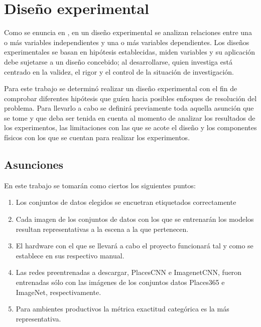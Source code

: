 \section{Diseño experimental}

Como se enuncia en \cite{hernandez2010metodologia}, en un diseño experimental se analizan relaciones entre una o más variables independientes y una o más variables dependientes. Los diseños experimentales se basan en hipótesis establecidas, miden variables y su aplicación debe sujetarse a un diseño concebido; al desarrollarse, quien investiga está centrado en la validez, el rigor y el control de la situación de investigación.

Para este trabajo se determinó realizar un diseño experimental con el fin de comprobar diferentes hipótesis que guíen hacia posibles enfoques de resolución del problema. Para llevarlo a cabo se definirá previamente toda aquella asunción que se tome y que deba ser tenida en cuenta al momento de analizar los resultados de los experimentos, las limitaciones con las que se acote el diseño y los componentes físicos con los que se cuentan para realizar los experimentos.

\subsection{Asunciones}
En este trabajo se tomarán como ciertos los siguientes puntos:
\begin{enumerate}
	\item Los conjuntos de datos elegidos se encuetran etiquetados correctamente 
	\item Cada imagen de los conjuntos de datos con los que se entrenarán los modelos resultan representativas a la escena a la que pertenecen.
	\item El hardware con el que se llevará a cabo el proyecto funcionará tal y como se establece en sus respectivo manual.
	\item Las redes preentrenadas a descargar, PlacesCNN e ImagenetCNN, fueron entrenadas sólo con las imágenes de los conjuntos datos Places365 e ImageNet, respectivamente.
	\item Para ambientes productivos la métrica exactitud categórica \cite{balanced_accuracy_score} es la más representativa.
\end{enumerate}

